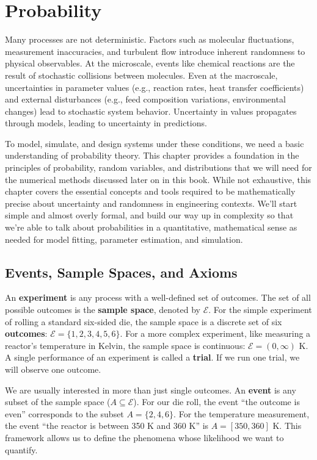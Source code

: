 \chapter{Probability}
Many processes are not deterministic. Factors such as molecular fluctuations, measurement inaccuracies, and turbulent flow introduce inherent randomness to physical observables. At the microscale, events like chemical reactions are the result of stochastic collisions between molecules. Even at the macroscale, uncertainties in parameter values (e.g., reaction rates, heat transfer coefficients) and external disturbances (e.g., feed composition variations, environmental changes) lead to stochastic system behavior. Uncertainty in values propagates through models, leading to uncertainty in predictions.

To model, simulate, and design systems under these conditions, we need a basic understanding of probability theory. This chapter provides a foundation in the principles of probability, random variables, and distributions that we will need for the numerical methods discussed later on in this book. While not exhaustive, this chapter covers the essential concepts and tools required to be mathematically precise about uncertainty and randomness in engineering contexts. We'll start simple and almost overly formal, and build our way up in complexity so that we're able to talk about probabilities in a quantitative, mathematical sense as needed for model fitting, parameter estimation, and simulation.


\section{Events, Sample Spaces, and Axioms}
An \textbf{experiment} is any process with a well-defined set of outcomes. The set of all possible outcomes is the \textbf{sample space}, denoted by $\mathcal{E}$. For the simple experiment of rolling a standard six-sided die, the sample space is a discrete set of six \textbf{outcomes}: $\mathcal{E} = \{1, 2, 3, 4, 5, 6\}$. For a more complex experiment, like measuring a reactor's temperature in Kelvin, the sample space is continuous: $\mathcal{E} = (0,\infty)$ K. A single performance of an experiment is called a \textbf{trial}. If we run one trial, we will observe one outcome.

We are usually interested in more than just single outcomes. An \textbf{event} is any subset of the sample space ($A \subseteq \mathcal{E}$). For our die roll, the event ``the outcome is even'' corresponds to the subset $A = \{2, 4, 6\}$. For the temperature measurement, the event ``the reactor is between 350 K and 360 K'' is $A = [350, 360]$ K. This framework allows us to define the phenomena whose likelihood we want to quantify. 

